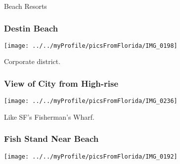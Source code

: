 \begin{frame}[plain,c]
  \begin{center}
    \Huge Beach Resorts 
  \end{center}
\end{frame} 


\begin{frame}[plain,c] 
\frametitle{Destin Beach}
\begin{center}
\texttt{[image: ../../myProfile/picsFromFlorida/IMG\_0198]}
\end{center} 
\end{frame}
 


\begin{frame}[plain,c]
\begin{center}
\Huge Corporate district.  
\end{center}
\end{frame}

\begin{frame}[plain,c]
\frametitle{View of City from High-rise}
\begin{center}
\texttt{[image: ../../myProfile/picsFromFlorida/IMG\_0236]}
\end{center}
\end{frame}

\begin{frame}[plain,c]
\begin{center}
\Huge Like SF's Fisherman's Wharf. 
\end{center}
\end{frame} 


\begin{frame}[plain,c] 
\frametitle{Fish Stand Near Beach}
\begin{center} 
\texttt{[image: ../../myProfile/picsFromFlorida/IMG\_0192]}
\end{center} 

\end{frame}

